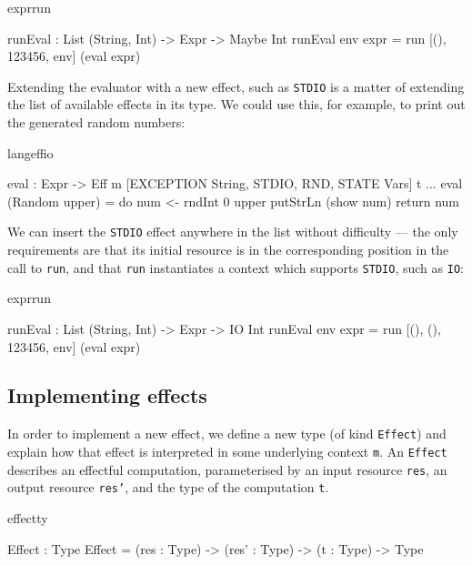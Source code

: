 \begin{SaveVerbatim}{exprrun}

runEval : List (String, Int) -> Expr -> Maybe Int
runEval env expr = run [(), 123456, env] (eval expr)

\end{SaveVerbatim}

\noindent
Extending the evaluator with a new effect, such as \texttt{STDIO} is a matter
of extending the list of available effects in its type.  We could use this, for
example, to print out the generated random numbers:

\begin{SaveVerbatim}{langeffio}

eval : Expr -> 
       Eff m [EXCEPTION String, STDIO, 
              RND, STATE Vars] t
...
eval (Random upper) = do num <- rndInt 0 upper
                         putStrLn (show num)
                         return num

\end{SaveVerbatim}

\noindent
We can insert the \texttt{STDIO} effect anywhere in the list without difficulty
--- the only requirements are that its initial resource is in the corresponding
position in the call to \texttt{run}, and that \texttt{run} instantiates
a context which supports \texttt{STDIO}, such as \texttt{IO}:

\begin{SaveVerbatim}{exprrun}

runEval : List (String, Int) -> Expr -> IO Int
runEval env expr 
    = run [(), (), 123456, env] (eval expr)

\end{SaveVerbatim}
\subsection{Implementing effects}

In order to implement a new effect, we define a new type (of kind \texttt{Effect})
and explain how that effect is interpreted in some underlying context
\texttt{m}. An \texttt{Effect} describes an effectful computation,
parameterised by an input resource \texttt{res}, an output resource \texttt{res'}, 
and the type of the computation \texttt{t}.

\begin{SaveVerbatim}{effectty}

Effect : Type
Effect = (res : Type) -> (res' : Type) -> 
         (t : Type) -> Type

\end{SaveVerbatim}

